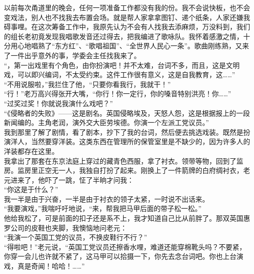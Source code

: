 以前每次甬道里的晚会，任何一项准备工作都没有我的份。我不会说快板，也不会变戏法，别人也不找我去布置会场。就是帮人家拿拿图钉、递个纸条，人家还嫌我碍事哩。在这次筹备工作中，我原先认为不会有人找我去添麻烦，万没料到，我们的组长老初竟发现我唱歌发音还过得去，把我编进了歌咏队。我怀着感激之情，十分用心地唱熟了“东方红”、“歌唱祖国”、“全世界人民心一条”。歌曲刚练熟，又来了一件出乎意外的事，学委会主任找我来了。\\

“，第一出戏里有个角色，由你扮演吧！并不太难，台词不多，而且，这是文明戏，可以即兴编词，不太受约束。这件工作很有意义，这是自我教育，这……”\\

“不用说服啦，”我拦住了他，“只要你看我行，我就干！”\\

“行！”老万高兴得张开大嘴，“你行！你一定行，你的嗓音特别洪亮！你……”\\

“过奖过奖！你就说我演什么戏吧？”\\

“《侵略者的失败》——这是剧名。英国侵略埃及，天怒人怨，这是根据报上的一段新闻编的。主角老润，演外交大臣劳埃德。你演一个左派工党议员。”\\

我到那里了解了剧情，看了剧本，抄下了我的台词，然后便去挑选戏装。既然是扮演洋人，当然要穿洋装。这类东西在管理所的保管室里是不缺少的，因为许多人的洋装都存在这里。\\

我拿出了那套在东京法庭上穿过的藏青色西服，拿了衬衣。领带等物，回到了监房。监房里正空无一人，我独自打扮了起来。刚换上了一件箭牌的白府绸衬衣，老元进来了，他吓了一跳，怔了半晌才问我：\\

“你这是于什么？”\\

我一半是由于兴奋，一半是由于衬衣的领子太紧，一时说不出话来。\\

“我要演戏，”我喘吁吁地说，“来，帮我把马甲后面的带子松一松。”\\

他给我松了，可是前面的扣子还是系不上，我才知道自己比从前胖了。那双英国惠罗公司的皮鞋也夹脚，我懊恼地问老元：\\

“我演一个英国工党的议员，不换皮鞋行不行？”\\

“得啦吧！”老元说，“英国工党议员还擦香水哩，难道还能穿棉靴头吗？不要紧，你穿一会儿也许就不紧了，这马甲可以拾摄一下，你先去念台词吧。你也上台演戏，真是奇闻！哈哈！……”\\

